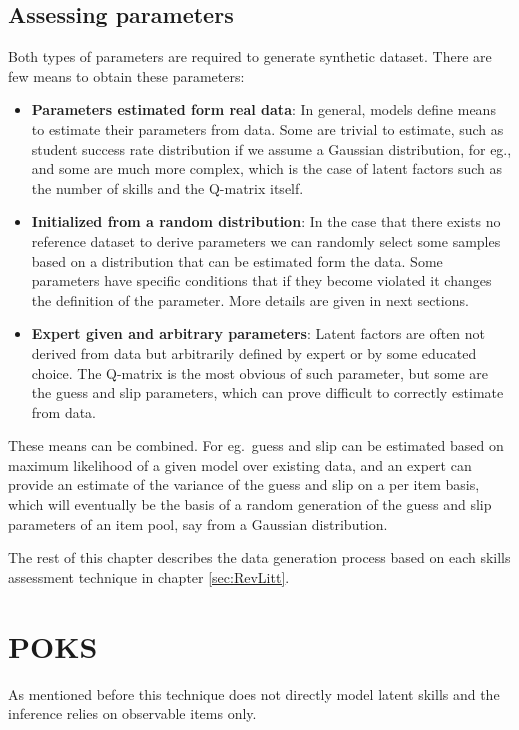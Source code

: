 \subsection{Assessing parameters}

Both types of parameters are required to generate synthetic dataset. There are few means to obtain these parameters:
\begin{itemize}
\item \textbf{Parameters estimated form real data}: In general, models define means to estimate their parameters from data.  Some are trivial to estimate, such as student success rate distribution if we assume a Gaussian distribution, for eg., and some are much more complex, which is the case of latent factors such as the number of skills and the Q-matrix itself.
\item \textbf{Initialized from a random distribution}: In the case that there exists no reference dataset to derive parameters we can randomly select some samples based on a distribution that can be estimated form the data. Some parameters have specific conditions that if they become violated it changes the definition of the parameter. More details are given in next sections.
\item \textbf{Expert given and arbitrary parameters}: Latent factors are often not derived from data but arbitrarily defined by expert or by some educated choice. The Q-matrix is the most obvious of such parameter, but some are the guess and slip parameters, which can prove difficult to correctly estimate from data.

\end{itemize}

These means can be combined. For eg.\ guess and slip can be estimated based on maximum likelihood of a given model over existing data, and an expert can provide an estimate of the variance of the guess and slip on a per item basis, which will eventually be the basis of a random generation of the guess and slip parameters of an item pool, say from a Gaussian distribution.

The rest of this chapter describes the data generation process based on each skills assessment technique in chapter \ref{sec:RevLitt}.

\section{POKS}

As mentioned before this technique does not directly model latent skills and the inference relies on observable items only. 

